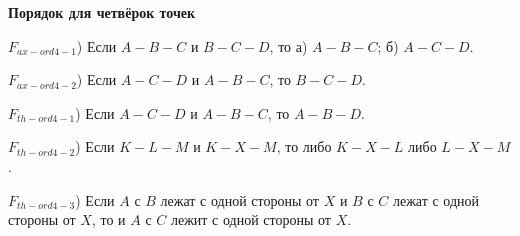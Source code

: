 \documentclass[a4paper]{article}
\begin{document}
\textbf{Порядок для четвёрок точек}

$F_{ax-ord4-1}$) Если $A-B-C$ и $B-C-D$, то а) $A-B-C$; б) $A-C-D$.

$F_{ax-ord4-2}$) Если $A-C-D$ и $A-B-C$, то $B-C-D$.

$F_{th-ord4-1}$) Если $A-C-D$ и $A-B-C$, то $A-B-D$.

$F_{th-ord4-2}$) Если $K-L-M$ и $K-X-M$, то либо $K-X-L$ либо $L-X-M$.

$F_{th-ord4-3}$) Если $A$ с $B$ лежат с одной стороны от $X$ и $B$ с $C$ лежат с одной стороны от $X$, то и $A$ с $C$ лежит с одной стороны от $X$.

\clearpage

\tableofcontents
\end{document}
